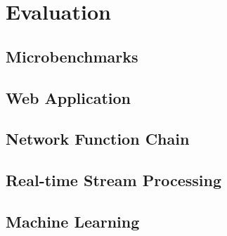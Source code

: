 \section{Evaluation}
\label{sec:evaluation}

\subsection{Microbenchmarks}

\subsection{Web Application}

\subsection{Network Function Chain}

\subsection{Real-time Stream Processing}

\subsection{Machine Learning}
